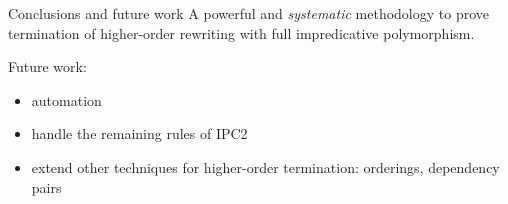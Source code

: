 \documentclass[10pt,presentation,color=names]{beamer}
\begin{document}
\begin{frame}{Conclusions and future work}
  A powerful and \emph{systematic} methodology to prove termination of
  higher-order rewriting with full impredicative polymorphism.\pause

  \bigskip
  Future work:
  \begin{itemize}
  \item automation\pause
  \item handle the remaining rules of IPC2\pause
  \item extend other techniques for higher-order termination:
    orderings, dependency pairs
  \end{itemize}
\end{frame}
\end{document}
